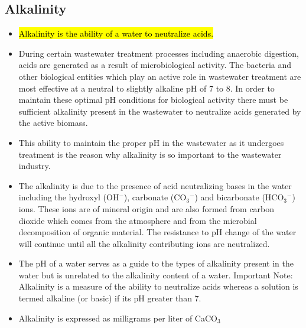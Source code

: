 			
\subsection{Alkalinity}	
			\begin{itemize}
				\item \hl{Alkalinity is the ability of a water to neutralize acids.}  
				\item During certain wastewater treatment processes including anaerobic digestion, acids are generated as a result of microbiological activity.  The bacteria and other biological entities which play an active role in wastewater treatment are most effective at a neutral to slightly alkaline pH of 7 to 8.  In order to maintain these optimal pH conditions for biological activity there must be sufficient alkalinity present in the wastewater to neutralize acids generated by the active biomass.
				\item This ability to maintain the proper pH in the wastewater as it undergoes treatment is the reason why alkalinity is so important to the wastewater industry.
				\item The alkalinity is due to the presence of acid neutralizing bases in the water including the hydroxyl (OH$^-$), carbonate (CO$_3$$^-$) and bicarbonate (HCO$_3$$^-$)  ions.  These ions are of mineral origin and are also formed from carbon dioxide which comes from the atmosphere and from the microbial decomposition of organic material.  The resistance to pH change of the water will continue until all the alkalinity contributing ions are neutralized.  
				\item The pH of a water serves as a guide to the types of alkalinity present in the water but is unrelated to the alkalinity content of a water.  Important Note:  Alkalinity is a measure of the ability to neutralize acids whereas a solution is termed alkaline (or basic) if its pH greater than 7. 
				\item Alkalinity is expressed as milligrams per liter of CaCO$_3$
			\end{itemize}
			
